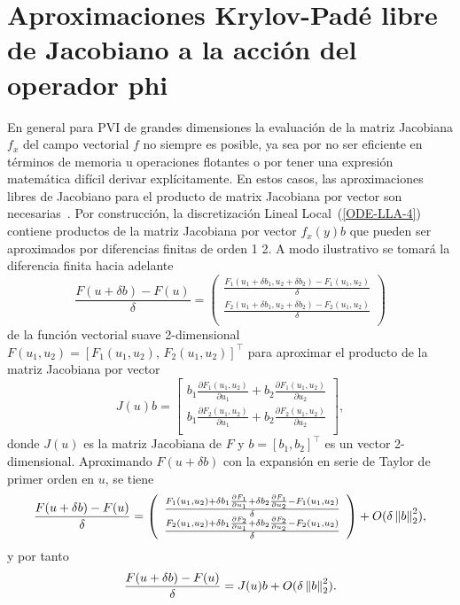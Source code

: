 \section{Aproximaciones Krylov-Padé libre de Jacobiano a la acción del operador phi} \label{section:fj-krylov-pade-approx}
En general para PVI de grandes dimensiones la evaluación de la matriz Jacobiana $f_x$ del campo vectorial $f$ no siempre es posible, ya sea por no ser eficiente en términos de memoria u operaciones flotantes o por tener una expresión matemática difícil derivar explícitamente. En estos casos, las aproximaciones libres de Jacobiano para el producto de matrix Jacobiana por vector son necesarias~\cite{al2009complex,knoll2004jacobian}. Por construcción, la discretización Lineal Local~(\ref{ODE-LLA-4}) contiene productos de la matriz Jacobiana por vector $f_x(y)b$ que pueden ser aproximados por diferencias finitas de orden 1  2. A modo ilustrativo se tomará la diferencia finita hacia adelante
\begin{equation*}
	\frac{F(u+\delta b)-F(u)}{\delta} =  \left(\begin{array}{c}
		\frac{F_1(u_1+\delta b_1,u_2+\delta b_2)-F_1(u_1,u_2)}{\delta}\\
		\frac{F_2(u_1+\delta b_1,u_2+\delta b_2)-F_2(u_1,u_2)}{\delta}\\
	\end{array}\right)
\end{equation*}
de la función vectorial suave 2-dimensional $F(u_1,u_2)=[F_1(u_1,u_2),\,F_2(u_1,u_2)]^{\intercal}$ para aproximar el producto de la matriz Jacobiana por vector \begin{equation*}
	J(u)b = \left[\begin{array}{c}
		b_1\frac{\partial F_1(u_1,u_2)}{\partial u_1} + b_2\frac{\partial F_1(u_1,u_2)}{\partial u_2}\\
		b_1\frac{\partial F_2(u_1,u_2)}{\partial u_1} + b_2\frac{\partial F_2(u_1,u_2)}{\partial u_2}\\
	\end{array}\right],
\end{equation*}
donde $J(u)$ es la matriz Jacobiana de $F$ y $b=[b_1,b_2]^{\intercal}$ es un vector 2-dimensional. Aproximando $F(u+\delta b)$ con la expansión en serie de Taylor de primer orden en $u$, se tiene
\begin{equation*}
	\frac{F(u+\delta b)-F(u)}{\delta} =  \left(\begin{array}{c}
		\frac{F_1(u_1,u_2) + \delta b_1 \frac{\partial F_1}{\partial u_1} + \delta b_2 \frac{\partial F_1}{\partial u_2} -F_1(u_1,u_2)}{\delta}\\
		\frac{F_2(u_1,u_2) + \delta b_1 \frac{\partial F_2}{\partial u_1} + \delta b_2 \frac{\partial F_2}{\partial u_2} -F_2(u_1,u_2)}{\delta}\\
	\end{array}\right)  + O(\delta\left\lVert b \right\rVert_2^2),
\end{equation*}
y por tanto
\begin{equation*}
	\frac{F(u+\delta b)-F(u)}{\delta} =  J(u)b + O(\delta\left\lVert b \right\rVert_2^2).
\end{equation*}


